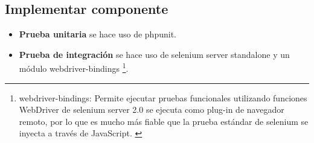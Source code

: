 \subsection{Implementar componente}

\begin{itemize}

\item \textbf{Prueba unitaria} se hace uso de phpunit.

\item \textbf{Prueba de integración} se hace uso de selenium server
standalone y un módulo webdriver-bindings \footnote{webdriver-bindings:
Permite ejecutar pruebas funcionales utilizando funciones WebDriver de
selenium server 2.0 se ejecuta como plug-in de navegador remoto,
por lo que es mucho más fiable que la prueba estándar de selenium se inyecta
a través de JavaScript. \cite{webdriverTest}}.

\end{itemize}

